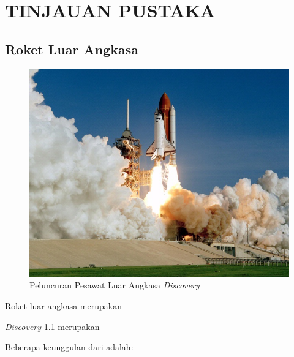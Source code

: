 \chapter{TINJAUAN PUSTAKA}
\vspace{4ex}

\setlength{\parindent}{7ex}


\section{Roket Luar Angkasa}
\vspace{1ex}

\begin{figure} [ht] \centering
	\includegraphics[scale=0.45]{gambar/space-shuttle.jpg}
	\caption{Peluncuran Pesawat Luar Angkasa \emph{Discovery}}
	\label{fig:spaceShuttle}
\end{figure}

Roket luar angkasa merupakan \lipsum[1]
\vspace{0.5ex}

\emph{Discovery} \ref{fig:spaceShuttle} merupakan \lipsum[2]

Beberapa keunggulan dari \lipsum[3][1-2] adalah:
\vspace{0.5ex}

